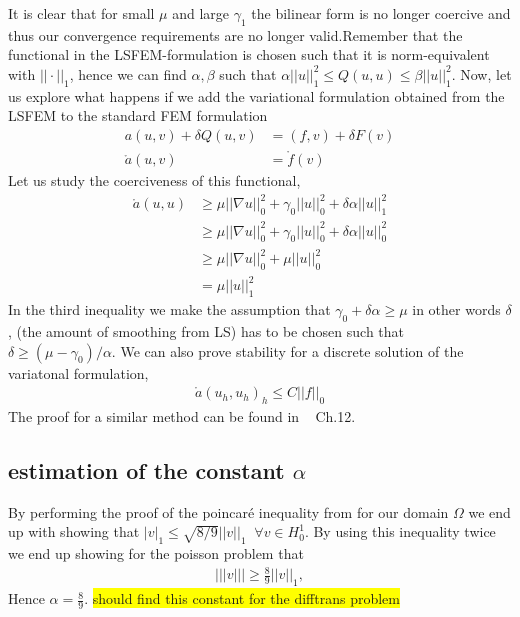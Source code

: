 It is clear that for small $\mu$ and large $\gamma_1$ the bilinear form is no longer coercive and thus our convergence requirements are no longer valid.Remember that the functional in the LSFEM-formulation is chosen such that it is norm-equivalent with $|| \cdot ||_1 $, hence we can find $\alpha,\beta$ such that $\alpha||u||_1^2 \leq Q(u,u) \leq \beta||u||_1^2 $.
Now, let us explore what happens if we add the variational formulation obtained from the LSFEM to the standard FEM formulation
\begin{align}
	a(u,v) + \delta Q(u,v) &= (f,v) + \delta F(v) \\
	\mathring{a}(u,v) &= \mathring{f}(v)
	\label{eq:GLS}
\end{align}
Let us study the coerciveness of this functional,
\begin{align}
	\mathring{a}(u,u) &\geq \mu ||\nabla u||_0^2+\gamma_0||u||_0^2+\delta \alpha ||u||^2_1 \\
	&\geq \mu ||\nabla u||_0^2+\gamma_0||u||_0^2+\delta \alpha ||u||^2_0 \\
	&\geq \mu ||\nabla u||_0^2+\mu ||u||_0^2 \\
	&= \mu ||u||^2_1
	\label{eq:coercivity}
\end{align}
In the third inequality we make the assumption that $\gamma_0+\delta \alpha \geq \mu $ in other words $\delta$, (the amount of smoothing from LS) has to be chosen such that $\delta \geq (\mu-\gamma_0)/\alpha$.
We can also prove stability for a discrete solution of the variatonal formulation, 
\begin{align}
	\mathring{a}(u_h,u_h)_h \leq C ||f||_0
	\label{eq:stabilityResult}
\end{align}
The proof for a similar method can be found in ~\cite{Quarteroni} Ch.12. 



\subsection{estimation of the constant $\alpha$}

By performing the proof of the poincar\'e inequality from \cite{Quarteroni} for our domain $\Omega$ we end up with showing that $|v|_1\leq \sqrt{8/9}||v||_1 \;\; \forall v \in H^1_0$. By using this inequality twice we end up showing for the poisson problem that
\begin{align}
	|||v||| \geq \frac{8}{9}||v||_1,
	\label{eq:resultAlpha}
\end{align}
Hence $\alpha=\frac{8}{9}$. \colorbox{yellow}{should find this constant for the difftrans problem}
